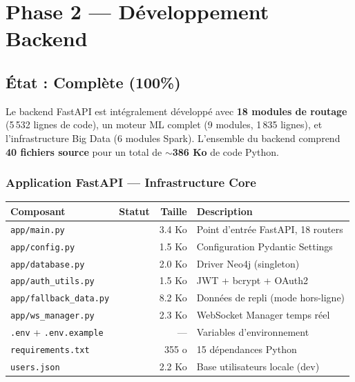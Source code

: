 \documentclass[12pt,a4paper]{article}
\newcommand{\cmark}{\textcolor{vert}{\ding{51}}}
\begin{document}
\section{Phase 2 — Développement Backend}

\subsection{État : \textcolor{vert}{Complète (100\%)}}

Le backend FastAPI est intégralement développé avec \textbf{18 modules de routage} (5\,532 lignes de code), un moteur ML complet (9 modules, 1\,835 lignes), et l'infrastructure Big Data (6 modules Spark). L'ensemble du backend comprend \textbf{40 fichiers source} pour un total de \textbf{$\sim$386 Ko} de code Python.

\subsubsection{Application FastAPI — Infrastructure Core}

\begin{center}
\renewcommand{\arraystretch}{1.3}
\begin{tabular}{|l|c|r|l|}
\hline
\rowcolor{bleu!15}
\textbf{Composant} & \textbf{Statut} & \textbf{Taille} & \textbf{Description} \\
\hline
\texttt{app/main.py} & \cmark & 3.4 Ko & Point d'entrée FastAPI, 18 routers \\
\hline
\texttt{app/config.py} & \cmark & 1.5 Ko & Configuration Pydantic Settings \\
\hline
\texttt{app/database.py} & \cmark & 2.0 Ko & Driver Neo4j (singleton) \\
\hline
\texttt{app/auth\_utils.py} & \cmark & 1.5 Ko & JWT + bcrypt + OAuth2 \\
\hline
\texttt{app/fallback\_data.py} & \cmark & 8.2 Ko & Données de repli (mode hors-ligne) \\
\hline
\texttt{app/ws\_manager.py} & \cmark & 2.3 Ko & WebSocket Manager temps réel \\
\hline
\texttt{.env} + \texttt{.env.example} & \cmark & --- & Variables d'environnement \\
\hline
\texttt{requirements.txt} & \cmark & 355 o & 15 dépendances Python \\
\hline
\texttt{users.json} & \cmark & 2.2 Ko & Base utilisateurs locale (dev) \\
\hline
\end{tabular}
\end{center}
\end{document}
